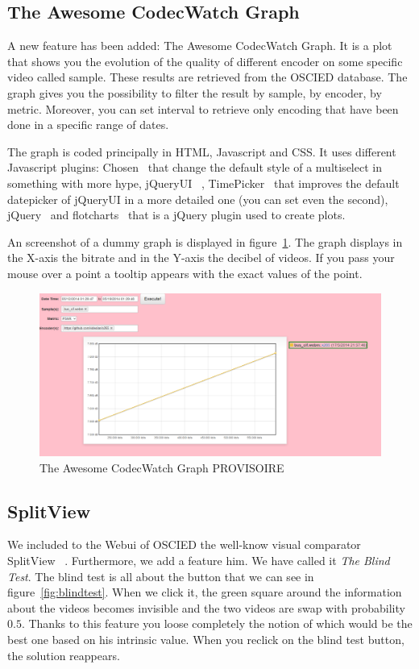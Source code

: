\documentclass[a4paper,12pt]{article}
\begin{document}
\subsection{The Awesome CodecWatch Graph}
A new feature has been added: The Awesome CodecWatch Graph. It is a plot that shows you the evolution of the quality of different encoder on some specific video called sample. These results are retrieved from the OSCIED database. The graph gives you the possibility to filter the result by sample, by encoder, by metric. Moreover, you can set interval to retrieve only encoding that have been done in a specific range of dates.

The graph is coded principally in HTML, Javascript and CSS. It uses different Javascript plugins: Chosen~ \cite{harvesthq_chosen} that change the default style of a multiselect in something with more hype, jQueryUI~ \cite{jqueryui}, TimePicker~ \cite{timepicker} that improves the default datepicker of jQueryUI in a more detailed one (you can set even the second), jQuery~ \cite{jquery} and flotcharts~ \cite{flotchart} that is a jQuery plugin used to create plots.

An screenshot of a dummy graph is displayed in figure~\ref{fig:graph1}. The graph displays in the X-axis the bitrate and in the Y-axis the decibel of videos. If you pass your mouse over a point a tooltip appears with the exact values of the point.

\begin{figure}[!h]
	\centering
	\includegraphics[width=1\textwidth]{figures/graph1.png}
	\caption{The Awesome CodecWatch Graph PROVISOIRE}
	\label{fig:graph1}
\end{figure}

\subsection{SplitView}
We included to the Webui of OSCIED the well-know visual comparator SplitView~ \cite{splitview}. Furthermore, we add a feature him. We have called it \emph{The Blind Test}. The blind test is all about the button that we can see in figure~\ref{fig:blindtest}. When we click it, the green square around the information about the videos becomes invisible and the two videos are swap with probability $0.5$. Thanks to this feature you loose completely the notion of which would be the best one based on his intrinsic value. When you reclick on the blind test button, the solution reappears.
\end{document}
